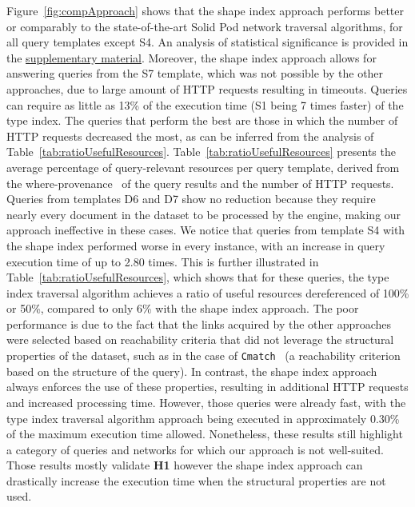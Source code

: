 Figure~\ref{fig:compApproach} shows that the shape index approach performs better or comparably to the state-of-the-art Solid Pod network traversal algorithms, for all query templates except S4.
An analysis of statistical significance is provided in the \hyperref[sec:supplementalMaterial]{supplementary material}.
Moreover, the shape index approach allows for answering queries from the S7 template, which was not possible by the other approaches, due to large amount of HTTP requests resulting in timeouts.
Queries can require as little as 13\% of the execution time (S1 being 7 times faster) of the type index.
The queries that perform the best are those in which the number of HTTP requests decreased the most, as can be inferred from the analysis of Table~\ref{tab:ratioUsefulResources}.
Table~\ref{tab:ratioUsefulResources} presents the average percentage of query-relevant resources per query template, derived from the where-provenance~\cite{buneman2001and} of the query results and the number of HTTP requests. 
Queries from templates D6 and D7 show no reduction because they require nearly every document in the dataset to be processed by the engine, making our approach ineffective in these cases.
We notice that queries from template S4 with the shape index performed worse in every instance, with an increase in query execution time of up to 2.80 times.
This is further illustrated in Table~\ref{tab:ratioUsefulResources}, which shows that for these queries, the type index traversal algorithm achieves a ratio of useful resources dereferenced of 100\% or 50\%, compared to only 6\% with the shape index approach.
The poor performance is due to the fact that the links acquired by the other approaches were selected based on reachability criteria that did not leverage the structural properties of the dataset, such as in the case of \texttt{Cmatch}~\cite{hartig2016walking} (a reachability criterion based on the structure of the query).
In contrast, the shape index approach always enforces the use of these properties, resulting in additional HTTP requests and increased processing time.
However, those queries were already fast, with the type index traversal algorithm approach being executed in approximately 0.30\% of the maximum execution time allowed.
Nonetheless, these results still highlight a category of queries and networks for which our approach is not well-suited.
Those results mostly validate \textbf{H1} however the shape index approach can drastically increase the execution time when the structural properties are not used.

